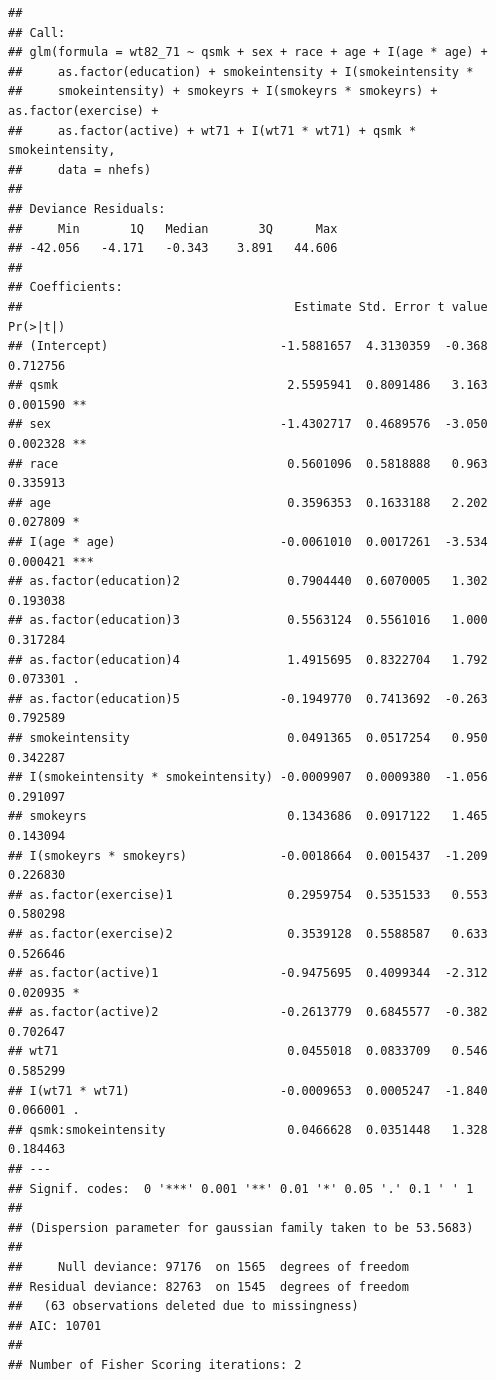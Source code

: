 \documentclass[
  10pt,
]{book}
\begin{document}
\begin{verbatim}
## 
## Call:
## glm(formula = wt82_71 ~ qsmk + sex + race + age + I(age * age) + 
##     as.factor(education) + smokeintensity + I(smokeintensity * 
##     smokeintensity) + smokeyrs + I(smokeyrs * smokeyrs) + as.factor(exercise) + 
##     as.factor(active) + wt71 + I(wt71 * wt71) + qsmk * smokeintensity, 
##     data = nhefs)
## 
## Deviance Residuals: 
##     Min       1Q   Median       3Q      Max  
## -42.056   -4.171   -0.343    3.891   44.606  
## 
## Coefficients:
##                                      Estimate Std. Error t value Pr(>|t|)    
## (Intercept)                        -1.5881657  4.3130359  -0.368 0.712756    
## qsmk                                2.5595941  0.8091486   3.163 0.001590 ** 
## sex                                -1.4302717  0.4689576  -3.050 0.002328 ** 
## race                                0.5601096  0.5818888   0.963 0.335913    
## age                                 0.3596353  0.1633188   2.202 0.027809 *  
## I(age * age)                       -0.0061010  0.0017261  -3.534 0.000421 ***
## as.factor(education)2               0.7904440  0.6070005   1.302 0.193038    
## as.factor(education)3               0.5563124  0.5561016   1.000 0.317284    
## as.factor(education)4               1.4915695  0.8322704   1.792 0.073301 .  
## as.factor(education)5              -0.1949770  0.7413692  -0.263 0.792589    
## smokeintensity                      0.0491365  0.0517254   0.950 0.342287    
## I(smokeintensity * smokeintensity) -0.0009907  0.0009380  -1.056 0.291097    
## smokeyrs                            0.1343686  0.0917122   1.465 0.143094    
## I(smokeyrs * smokeyrs)             -0.0018664  0.0015437  -1.209 0.226830    
## as.factor(exercise)1                0.2959754  0.5351533   0.553 0.580298    
## as.factor(exercise)2                0.3539128  0.5588587   0.633 0.526646    
## as.factor(active)1                 -0.9475695  0.4099344  -2.312 0.020935 *  
## as.factor(active)2                 -0.2613779  0.6845577  -0.382 0.702647    
## wt71                                0.0455018  0.0833709   0.546 0.585299    
## I(wt71 * wt71)                     -0.0009653  0.0005247  -1.840 0.066001 .  
## qsmk:smokeintensity                 0.0466628  0.0351448   1.328 0.184463    
## ---
## Signif. codes:  0 '***' 0.001 '**' 0.01 '*' 0.05 '.' 0.1 ' ' 1
## 
## (Dispersion parameter for gaussian family taken to be 53.5683)
## 
##     Null deviance: 97176  on 1565  degrees of freedom
## Residual deviance: 82763  on 1545  degrees of freedom
##   (63 observations deleted due to missingness)
## AIC: 10701
## 
## Number of Fisher Scoring iterations: 2
\end{verbatim}
\end{document}
